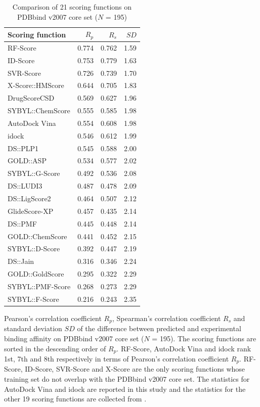 \begin{table}[!ht]
\caption{Comparison of 21 scoring functions on PDBbind v2007 core set ($N$ = 195)}
\begin{tabular}{lrrr}
\hline
Scoring function & $R_p$ & $R_s$ & $SD$\\
\hline
RF-Score & 0.774 & 0.762 & 1.59\\
ID-Score & 0.753 & 0.779 & 1.63\\
SVR-Score & 0.726 & 0.739 & 1.70\\
X-Score::HMScore & 0.644 & 0.705 & 1.83\\
DrugScoreCSD & 0.569 & 0.627 & 1.96\\
SYBYL::ChemScore & 0.555 & 0.585 & 1.98\\
AutoDock Vina & 0.554 & 0.608 & 1.98\\
idock & 0.546 & 0.612 & 1.99\\
DS::PLP1 & 0.545 & 0.588 & 2.00\\
GOLD::ASP & 0.534 & 0.577 & 2.02\\
SYBYL::G-Score & 0.492 & 0.536 & 2.08\\
DS::LUDI3 & 0.487 & 0.478 & 2.09\\
DS::LigScore2 & 0.464 & 0.507 & 2.12\\
GlideScore-XP & 0.457 & 0.435 & 2.14\\
DS::PMF & 0.445 & 0.448 & 2.14\\
GOLD::ChemScore & 0.441 & 0.452 & 2.15\\
SYBYL::D-Score & 0.392 & 0.447 & 2.19\\
DS::Jain & 0.316 & 0.346 & 2.24\\
GOLD::GoldScore & 0.295 & 0.322 & 2.29\\
SYBYL::PMF-Score & 0.268 & 0.273 & 2.29\\
SYBYL::F-Score & 0.216 & 0.243 & 2.35\\
\end{tabular}
\begin{flushleft}\label{ScoringFunctionComparison} Pearson's correlation coefficient $R_p$, Spearman's correlation coefficient $R_s$ and standard deviation $SD$ of the difference between predicted and experimental binding affinity on PDBbind v2007 core set ($N$ = 195). The scoring functions are sorted in the descending order of $R_p$. RF-Score, AutoDock Vina and idock rank 1st, 7th and 8th respectively in terms of Pearson's correlation coefficient $R_p$. RF-Score, ID-Score, SVR-Score and X-Score are the only scoring functions whose training set do not overlap with the PDBbind v2007 core set. The statistics for AutoDock Vina and idock are reported in this study and the statistics for the other 19 scoring functions are collected from \cite{1313,564,1305,1295}.
\end{flushleft}
\end{table}


